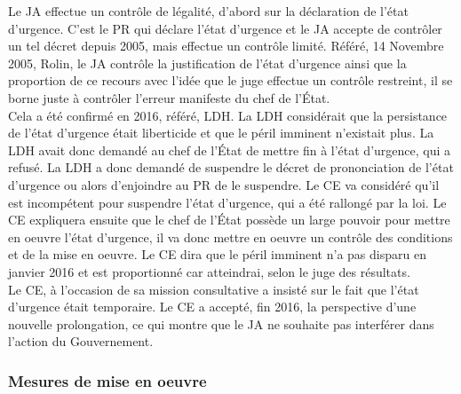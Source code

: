 \documentclass[10pt, a4paper, openany]{book}
\begin{document}
Le JA effectue un contrôle de légalité, d'abord sur la déclaration de l'état d'urgence. C'est le PR qui déclare l'état d'urgence et le JA accepte de contrôler un tel décret depuis 2005, mais effectue un contrôle limité. Référé, 14 Novembre 2005, Rolin, le JA contrôle la justification de l'état d'urgence ainsi que la proportion de ce recours avec l'idée que le juge effectue un contrôle restreint, il se borne juste à contrôler l'erreur manifeste du chef de l'État. \\
Cela a été confirmé en 2016, référé, LDH. La LDH considérait que la persistance de l'état d'urgence était liberticide et que le péril imminent n'existait plus. La LDH avait donc demandé au chef de l'État de mettre fin à l'état d'urgence, qui a refusé. La LDH a donc demandé de suspendre le décret de prononciation de l'état d'urgence ou alors d'enjoindre au PR de le suspendre. Le CE va considéré qu'il est incompétent pour suspendre l'état d'urgence, qui a été rallongé par la loi. Le CE expliquera ensuite que le chef de l'État possède un large pouvoir pour mettre en oeuvre l'état d'urgence, il va donc mettre en oeuvre un contrôle des conditions et de la mise en oeuvre. Le CE dira que le péril imminent n'a pas disparu en janvier 2016 et est proportionné car atteindrai, selon le juge des résultats. \\
Le CE, à l'occasion de sa mission consultative a insisté sur le fait que l'état d'urgence était temporaire. Le CE a accepté, fin 2016, la perspective d'une nouvelle prolongation, ce qui montre que le JA ne souhaite pas interférer dans l'action du Gouvernement. 

\subsubsection{Mesures de mise en oeuvre}
\end{document}

